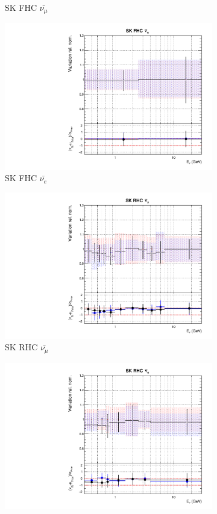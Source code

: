 \begin{figure}[t]
\begin{subfigure}{0.24\textwidth}
  \caption{SK FHC $\bar{\nu_{\mu}}$}
\end{subfigure}
\begin{subfigure}{0.24\textwidth}
  \centering
  \includegraphics[width=0.95\linewidth]{figs/rhcmpasmvflux11}
  \caption{SK FHC $\bar{\nu_e}$}
\end{subfigure}
\begin{subfigure}{0.24\textwidth}
  \centering
  \includegraphics[width=0.95\linewidth]{figs/rhcmpasmvflux12}
  \caption{SK RHC $\bar{\nu_{\mu}}$}
\end{subfigure}
\begin{subfigure}{0.24\textwidth}
  \centering
  \includegraphics[width=0.95\linewidth]{figs/rhcmpasmvflux13}

\end{subfigure}
\end{figure}

